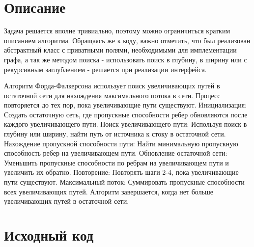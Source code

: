 \section{Описание}

Задача решается вполне тривиально, поэтому можно ограничиться кратким описанием алгоритма. Обращаясь же к коду, важно отметить, что был реализован абстрактный класс с приватными полями, необходимыми для имплементации графа, а так же методом поиска - использовать поиск в глубину, в ширину или с рекурсивным заглублением - решается при реализации интерфейса.

\par

Алгоритм Форда-Фалкерсона использует поиск увеличивающих путей в остаточной сети для нахождения максимального потока в сети. Процесс повторяется до тех пор, пока увеличивающие пути существуют. Инициализация: Создать остаточную сеть, где пропускные способности ребер обновляются после каждого увеличивающего пути. Поиск увеличивающего пути: Используя поиск в глубину или ширину, найти путь от источника к стоку в остаточной сети. Нахождение пропускной способности пути: Найти минимальную пропускную способность ребер на увеличивающем пути. Обновление остаточной сети: Уменьшить пропускные способности по ребрам на увеличивающем пути и увеличить их обратно. Повторение: Повторять шаги 2-4, пока увеличивающие пути существуют. Максимальный поток: Суммировать пропускные способности всех увеличивающих путей. Алгоритм завершается, когда нет больше увеличивающих путей в остаточной сети.

\pagebreak

\section{Исходный код}

\vspace{\baselineskip}

